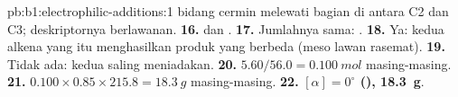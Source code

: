 \begin{solution}{pb:b1:electrophilic-additions:1}
bidang cermin melewati bagian di antara C2 dan C3; deskriptornya
berlawanan.
\textbf{16.}  dan .
\textbf{17.} Jumlahnya sama: .
\textbf{18.} Ya: kedua alkena yang  itu menghasilkan produk
yang berbeda (meso lawan rasemat).
\textbf{19.} Tidak ada: kedua  saling meniadakan.
\textbf{20.} $5.60/56.0 = \qty{0.100}{mol}$ masing-masing.
\textbf{21.} $0.100 \times 0.85 \times 215.8 = \qty{18.3}{g}$ masing-masing.
\textbf{22.} \textbf{$[\alpha] = 0^\circ$ (), \qty{18.3}{g}}.
\end{solution}
